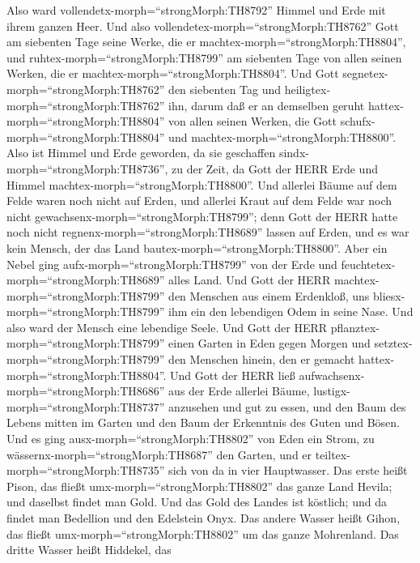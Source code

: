  Also ward vollendetx-morph=``strongMorph:TH8792'' Himmel
und Erde mit ihrem ganzen Heer.  Und also
vollendetex-morph=``strongMorph:TH8762'' Gott am siebenten Tage seine
Werke, die er machtex-morph=``strongMorph:TH8804'', und
ruhtex-morph=``strongMorph:TH8799'' am siebenten Tage von allen seinen
Werken, die er machtex-morph=``strongMorph:TH8804''.  Und
Gott segnetex-morph=``strongMorph:TH8762'' den siebenten Tag und
heiligtex-morph=``strongMorph:TH8762'' ihn, darum daß er an demselben
geruht hattex-morph=``strongMorph:TH8804'' von allen seinen Werken, die
Gott schufx-morph=``strongMorph:TH8804'' und
machtex-morph=``strongMorph:TH8800''.  Also ist Himmel und
Erde geworden, da sie geschaffen sindx-morph=``strongMorph:TH8736'', zu
der Zeit, da Gott der HERR Erde und Himmel
machtex-morph=``strongMorph:TH8800''.  Und allerlei Bäume
auf dem Felde waren noch nicht auf Erden, und allerlei Kraut auf dem
Felde war noch nicht gewachsenx-morph=``strongMorph:TH8799''; denn Gott
der HERR hatte noch nicht regnenx-morph=``strongMorph:TH8689'' lassen
auf Erden, und es war kein Mensch, der das Land
bautex-morph=``strongMorph:TH8800''.  Aber ein Nebel ging
aufx-morph=``strongMorph:TH8799'' von der Erde und
feuchtetex-morph=``strongMorph:TH8689'' alles Land.  Und
Gott der HERR machtex-morph=``strongMorph:TH8799'' den Menschen aus
einem Erdenkloß, uns bliesx-morph=``strongMorph:TH8799'' ihm ein den
lebendigen Odem in seine Nase. Und also ward der Mensch eine lebendige
Seele.  Und Gott der HERR
pflanztex-morph=``strongMorph:TH8799'' einen Garten in Eden gegen Morgen
und setztex-morph=``strongMorph:TH8799'' den Menschen hinein, den er
gemacht hattex-morph=``strongMorph:TH8804''.  Und Gott der
HERR ließ aufwachsenx-morph=``strongMorph:TH8686'' aus der Erde allerlei
Bäume, lustigx-morph=``strongMorph:TH8737'' anzusehen und gut zu essen,
und den Baum des Lebens mitten im Garten und den Baum der Erkenntnis des
Guten und Bösen.  Und es ging
ausx-morph=``strongMorph:TH8802'' von Eden ein Strom, zu
wässernx-morph=``strongMorph:TH8687'' den Garten, und er
teiltex-morph=``strongMorph:TH8735'' sich von da in vier Hauptwasser.
 Das erste heißt Pison, das fließt
umx-morph=``strongMorph:TH8802'' das ganze Land Hevila; und daselbst
findet man Gold.  Und das Gold des Landes ist köstlich; und
da findet man Bedellion und den Edelstein Onyx.  Das andere
Wasser heißt Gihon, das fließt umx-morph=``strongMorph:TH8802'' um das
ganze Mohrenland.  Das dritte Wasser heißt Hiddekel, das
